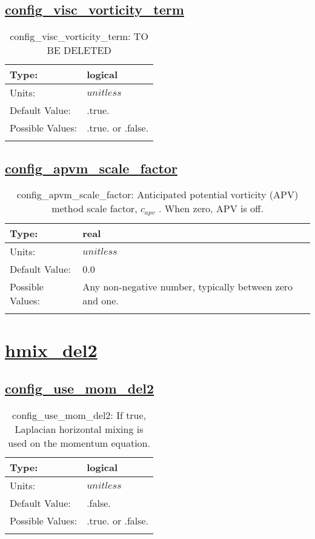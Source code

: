\subsection[config\_visc\_vorticity\_term]{\hyperref[sec:nm_tab_hmix]{config\_visc\_vorticity\_term}}
\label{subsec:nm_sec_config_visc_vorticity_term}
\begin{center}
\begin{longtable}{| p{2.0in} | p{4.0in} |}
    \hline
    Type: & logical \\
    \hline
    Units: & $unitless$ \\
    \hline
    Default Value: & .true. \\
    \hline
    Possible Values: & .true. or .false. \\
    \hline
    \caption{config\_visc\_vorticity\_term: {\color{red} TO BE DELETED}}
\end{longtable}
\end{center}
\subsection[config\_apvm\_scale\_factor]{\hyperref[sec:nm_tab_hmix]{config\_apvm\_scale\_factor}}
\label{subsec:nm_sec_config_apvm_scale_factor}
\begin{center}
\begin{longtable}{| p{2.0in} | p{4.0in} |}
    \hline
    Type: & real \\
    \hline
    Units: & $unitless$ \\
    \hline
    Default Value: & 0.0 \\
    \hline
    Possible Values: & Any non-negative number, typically between zero and one. \\
    \hline
    \caption{config\_apvm\_scale\_factor:  Anticipated potential vorticity (APV) method scale factor,  $c_{apv}$ .  When zero, APV is off.}
\end{longtable}
\end{center}
\section[hmix\_del2]{\hyperref[sec:nm_tab_hmix_del2]{hmix\_del2}}
\label{sec:nm_sec_hmix_del2}
\subsection[config\_use\_mom\_del2]{\hyperref[sec:nm_tab_hmix_del2]{config\_use\_mom\_del2}}
\label{subsec:nm_sec_config_use_mom_del2}
\begin{center}
\begin{longtable}{| p{2.0in} | p{4.0in} |}
    \hline
    Type: & logical \\
    \hline
    Units: & $unitless$ \\
    \hline
    Default Value: & .false. \\
    \hline
    Possible Values: & .true. or .false. \\
    \hline
    \caption{config\_use\_mom\_del2: If true, Laplacian horizontal mixing is used on the momentum equation.}
\end{longtable}
\end{center}
